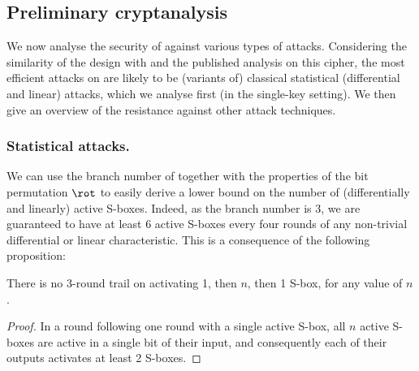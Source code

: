 \subsection{Preliminary cryptanalysis}

We now analyse the security of \fly against various types of attacks. Considering the similarity of the design with \present and the published analysis on this cipher, the
most efficient attacks on \fly are likely to be (variants of) classical statistical (differential and linear) attacks, which we analyse first (in the single-key setting).
We then give an overview of the resistance against other attack techniques. 

\subsubsection{Statistical attacks.}
\label{sec:stats}
We can use the branch number of \littlunOne together with the properties of the bit permutation $\rot$ to easily derive a lower bound on the number of
(differentially and linearly) active S-boxes. Indeed, as the branch number is 3, we are guaranteed to have at least 6 active S-boxes
every four rounds of any non-trivial differential or linear characteristic. This is a consequence of the following proposition:
\begin{prop}
There is no 3-round trail on \fly activating 1, then $n$, then 1 S-box, for any value of $n$. 
\end{prop}
\begin{proof}
In a round following one round with a single active S-box, all $n$ active S-boxes are active in a single bit of their input, and consequently
each of their outputs activates at least 2 S-boxes.
\end{proof}

